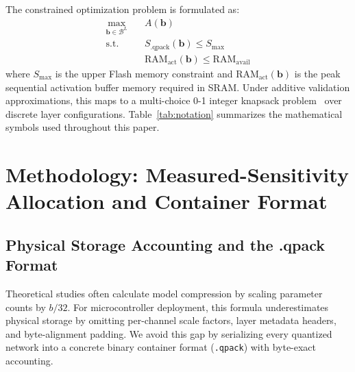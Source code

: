\documentclass{ieeeaccess}
\begin{document}
The constrained optimization problem is formulated as:
\begin{equation}
\label{eq:opt_problem}
\begin{aligned}
\max_{\mathbf{b} \in \mathcal{B}^L} \quad & A(\mathbf{b}) \\
\text{s.t.} \quad & S_{\text{.qpack}}(\mathbf{b}) \le S_{\text{max}} \\
& \text{RAM}_{\text{act}}(\mathbf{b}) \le \text{RAM}_{\text{avail}}
\end{aligned}
\end{equation}
where $S_{\text{max}}$ is the upper Flash memory constraint and $\text{RAM}_{\text{act}}(\mathbf{b})$ is the peak sequential activation buffer memory required in SRAM. Under additive validation approximations, this maps to a multi-choice 0-1 integer knapsack problem~\cite{martello1990knapsack} over discrete layer configurations. Table~\ref{tab:notation} summarizes the mathematical symbols used throughout this paper.



\section{Methodology: Measured-Sensitivity Allocation and Container Format}
\label{sec:method}

\subsection{Physical Storage Accounting and the .qpack Format}
Theoretical studies often calculate model compression by scaling parameter counts by $b/32$. For microcontroller deployment, this formula underestimates physical storage by omitting per-channel scale factors, layer metadata headers, and byte-alignment padding. We avoid this gap by serializing every quantized network into a concrete binary container format (\texttt{.qpack}) with byte-exact accounting.
\end{document}
